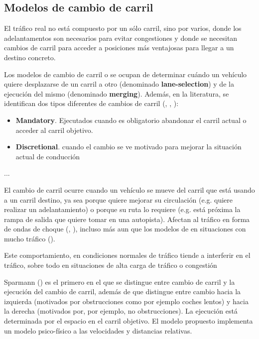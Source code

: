 \subsection{Modelos de cambio de carril}

El tráfico real no está compuesto por un sólo carril, sino por varios, donde los adelantamentos son necesarios para evitar congestiones y donde se necesitan cambios de carril para acceder a posiciones más ventajosas para llegar a un destino concreto.

Los modelos de cambio de carril o \textit{} se ocupan de determinar cuándo un vehículo quiere desplazarse de un carril a otro (denominado \textbf{lane-selection}) y de la ejecución del mismo (denominado \textbf{merging}). Además, en la literatura, se identifican dos tipos diferentes de cambios de carril (\cite{Gipps1986}, \cite{Yang1996}, \cite{Toledo2003}):

\begin{itemize}
	\item \textbf{Mandatory}. Ejecutados cuando es obligatorio abandonar el carril actual o acceder al carril objetivo.
	\item \textbf{Discretional}. cuando el cambio se ve motivado para mejorar la situación actual de conducción 
\end{itemize}

...

El cambio de carril ocurre cuando un vehículo se mueve del carril que está usando a un carril destino, ya sea porque quiere mejorar su circulación (e.g. quiere realizar un adelantamiento) o porque su ruta lo requiere (e.g. está próxima la rampa de salida que quiere tomar en una autopista). Afectan al tráfico en forma de ondas de choque (\cite{Sasoh2002}, \cite{Jin2006}), incluso más aun que los modelos de \textit{} en situaciones con mucho tráfico (\cite{Laval2006}).

Este comportamiento, en condiciones normales de tráfico tiende a interferir en el tráfico, sobre todo en situaciones de alta carga de tráfico o congestión

Sparmann (\cite{Sparmann1978}) es el primero en el que se distingue entre cambio de carril y la ejecución del cambio de carril, además de que distingue entre cambio hacia la izquierda (motivados por obstrucciones como por ejemplo coches lentos) y hacia la derecha (motivados por, por ejemplo, no obstrucciones). La ejecución está determinada por el espacio en el carril objetivo. El modelo propuesto implementa un modelo psico-físico a las velocidades y distancias relativas.

